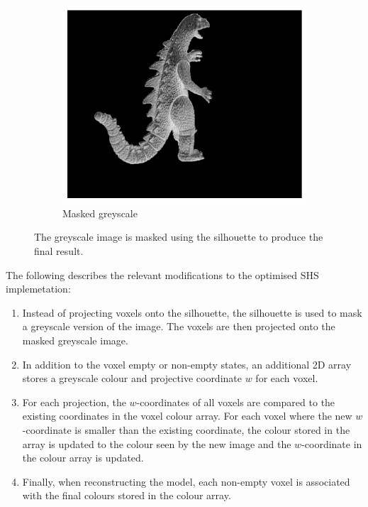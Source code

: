 \begin{figure}[ht]
  \hspace{1em}
  \begin{subfigure}[b]{0.25\textwidth}
    \centering
    \includegraphics[width=\textwidth]{images/q2_masked_img_5.png}
    \caption{Masked greyscale}
  \end{subfigure}
  \caption{The greyscale image is masked using the silhouette to produce the final result.}
  \label{fig:masked_img}
\end{figure}

The following describes the relevant modifications to the optimised SHS implemetation:

\begin{enumerate}
  \item Instead of projecting voxels onto the silhouette, the silhouette is used to mask a greyscale version of the image. The voxels are then projected onto the masked greyscale image.

  \item In addition to the voxel empty or non-empty states, an additional 2D array stores a greyscale colour and projective coordinate $w$ for each voxel.

  \item For each projection, the $w$-coordinates of all voxels are compared to the existing coordinates in the voxel colour array. For each voxel where the new $w$-coordinate is smaller than the existing coordinate, the colour stored in the array is updated to the colour seen by the new image and the $w$-coordinate in the colour array is updated.

  \item Finally, when reconstructing the model, each non-empty voxel is associated with the final colours stored in the colour array.

\end{enumerate}

